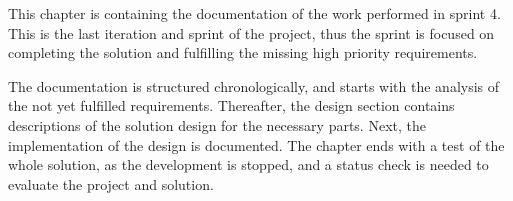 This chapter is containing the documentation of the work performed in sprint 4.
This is the last iteration and sprint of the project, thus the sprint is focused on completing the solution and fulfilling the missing high priority requirements.

The documentation is structured chronologically, and starts with the analysis of the not yet fulfilled requirements.
Thereafter, the design section contains descriptions of the solution design for the necessary parts.
Next, the implementation of the design is documented.
The chapter ends with a test of the whole solution, as the development is stopped, and a status check is needed to evaluate the project and solution.
